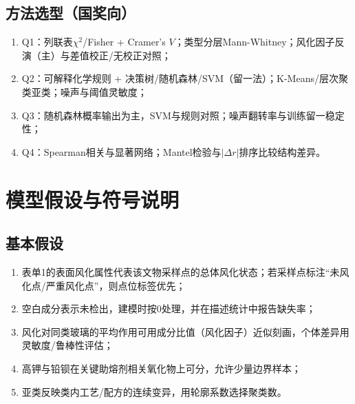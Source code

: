 \documentclass[UTF8,a4paper,12pt]{ctexart}
\begin{document}
\subsection{方法选型（国奖向）}
\begin{enumerate}[leftmargin=2em]
\item Q1：列联表$\chi^2$/Fisher + Cramer's $V$；类型分层Mann-Whitney；风化因子反演（主）与差值校正/无校正对照；
\item Q2：可解释化学规则 + 决策树/随机森林/SVM（留一法）；K-Means/层次聚类亚类；噪声与阈值灵敏度；
\item Q3：随机森林概率输出为主，SVM与规则对照；噪声翻转率与训练留一稳定性；
\item Q4：Spearman相关与显著网络；Mantel检验与$|\Delta r|$排序比较结构差异。
\end{enumerate}

\section{模型假设与符号说明}
\subsection{基本假设}
\begin{enumerate}[leftmargin=2em]
\item 表单1的表面风化属性代表该文物采样点的总体风化状态；若采样点标注“未风化点/严重风化点”，则点位标签优先；
\item 空白成分表示未检出，建模时按$0$处理，并在描述统计中报告缺失率；
\item 风化对同类玻璃的平均作用可用成分比值（风化因子）近似刻画，个体差异用灵敏度/鲁棒性评估；
\item 高钾与铅钡在关键助熔剂相关氧化物上可分，允许少量边界样本；
\item 亚类反映类内工艺/配方的连续变异，用轮廓系数选择聚类数。
\end{enumerate}
\end{document}
